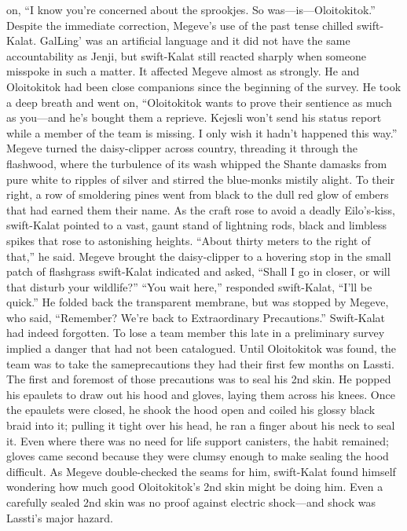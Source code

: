 \documentclass[9pt]{article}
\begin{document}
on, “I know you’re concerned about the sprookjes. So was—is—Oloitokitok.”
Despite the immediate correction, Megeve’s use of the past tense chilled swift-Kalat. GalLing’ was
an artificial language and it did not have the same accountability as Jenji, but swift-Kalat still reacted
sharply when someone misspoke in such a matter.
It affected Megeve almost as strongly. He and Oloitokitok had been close companions since the
beginning of the survey. He took a deep breath and went on, “Oloitokitok wants to prove their sentience
as much as you—and he’s bought them a reprieve. Kejesli won’t send his status report while a member
of the team is missing. I only wish it hadn’t happened this way.”
Megeve turned the daisy-clipper across country, threading it through the flashwood, where the
turbulence of its wash whipped the Shante damasks from pure white to ripples of silver and stirred the
blue-monks mistily alight. To their right, a row of smoldering pines went from black to the dull red glow
of embers that had earned them their name. As the craft rose to avoid a deadly Eilo’s-kiss, swift-Kalat
pointed to a vast, gaunt stand of lightning rods, black and limbless spikes that rose to astonishing heights.
“About thirty meters to the right of that,” he said.
Megeve brought the daisy-clipper to a hovering stop in the small patch of flashgrass swift-Kalat
indicated and asked, “Shall I go in closer, or will that disturb your wildlife?”
“You wait here,” responded swift-Kalat, “I’ll be quick.” He folded back the transparent membrane,
but was stopped by Megeve, who said, “Remember? We’re back to Extraordinary Precautions.”
Swift-Kalat had indeed forgotten. To lose a team member this late in a preliminary survey implied a
danger that had not been catalogued. Until Oloitokitok was found, the team was to take the sameprecautions they had their first few months on Lassti.
The first and foremost of those precautions was to seal his 2nd skin. He popped his epaulets to draw
out his hood and gloves, laying them across his knees. Once the epaulets were closed, he shook the
hood open and coiled his glossy black braid into it; pulling it tight over his head, he ran a finger about his
neck to seal it. Even where there was no need for life support canisters, the habit remained; gloves came
second because they were clumsy enough to make sealing the hood difficult.
As Megeve double-checked the seams for him, swift-Kalat found himself wondering how much good
Oloitokitok’s 2nd skin might be doing him. Even a carefully sealed 2nd skin was no proof against electric
shock—and shock was Lassti’s major hazard.
\end{document}
